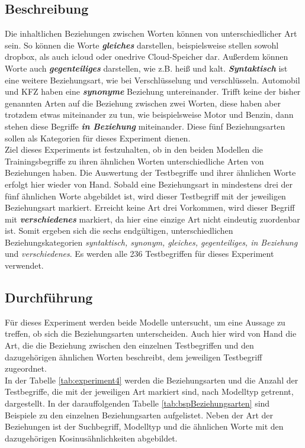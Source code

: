 \documentclass[12pt,a4paper]{report}
\begin{document}
		\subsection*{Beschreibung}
		Die inhaltlichen Beziehungen zwischen Worten können von unterschiedlicher Art sein. So können die Worte \textit{\textbf{gleiches}} darstellen, beispielsweise stellen sowohl \glqq dropbox\grqq, als auch \glqq icloud\grqq{}  oder \glqq onedrive\grqq{} Cloud-Speicher dar. Außerdem können Worte auch \textit{\textbf{gegenteiliges}} darstellen, wie z.B. \glqq heiß\grqq{} und \glqq kalt\grqq. \textit{\textbf{Syntaktisch}} ist eine weitere Beziehungsart, wie bei \glqq Verschlüsselung\grqq{} und \glqq verschlüsseln\grqq. \glqq Automobil\grqq{} und \glqq KFZ\grqq{} haben eine \textit{\textbf{synonyme}} Beziehung untereinander. Trifft keine der bisher genannten Arten auf die Beziehung zwischen zwei Worten, diese haben aber trotzdem etwas miteinander zu tun, wie beispielsweise \glqq Motor\grqq{} und \glqq Benzin\grqq{}, dann stehen diese Begriffe \textit{\textbf{in Beziehung}} miteinander. Diese fünf Beziehungsarten sollen als Kategorien für dieses Experiment dienen.\\
		 Ziel dieses Experiments ist festzuhalten, ob in den beiden Modellen die Trainingsbegriffe zu ihren ähnlichen Worten unterschiedliche Arten von Beziehungen haben. Die Auswertung der Testbegriffe und ihrer ähnlichen Worte erfolgt hier wieder von Hand. Sobald eine Beziehungsart in mindestens drei der fünf ähnlichen Worte abgebildet ist, wird dieser Testbegriff mit der jeweiligen Beziehungsart markiert. Erreicht keine Art drei Vorkommen, wird dieser Begriff mit \textit{\textbf{verschiedenes}} markiert, da hier eine einzige Art nicht eindeutig zuordenbar ist. Somit ergeben sich die sechs endgültigen, unterschiedlichen Beziehungskategorien \textit{syntaktisch, synonym, gleiches, gegenteiliges, in Beziehung} und \textit{verschiedenes}. Es werden alle 236 Testbegriffen für dieses Experiment verwendet.\\
		

		\subsection*{Durchführung}
		Für dieses Experiment werden beide Modelle untersucht, um eine Aussage zu treffen, ob sich die Beziehungsarten unterscheiden. Auch hier wird von Hand die Art, die die Beziehung zwischen den einzelnen Testbegriffen und den dazugehörigen ähnlichen Worten beschreibt, dem jeweiligen Testbegriff zugeordnet. \\
		In der Tabelle \ref{tab:experiment4} werden die Beziehungsarten und die Anzahl der Testbegriffe, die mit der jeweiligen Art markiert sind, nach Modelltyp getrennt, dargestellt. In der darauffolgenden Tabelle \ref{tab:bspBeziehungsarten} sind Beispiele zu den einzelnen Beziehungsarten aufgelistet. Neben der Art der Beziehungen ist der Suchbegriff, Modelltyp und die ähnlichen Worte mit den dazugehörigen Kosinusähnlichkeiten abgebildet.\\
		
\end{document}
